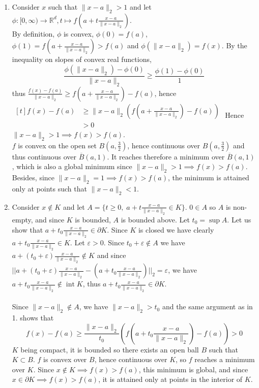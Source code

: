 \documentclass[a4paper,11pt]{article}
\DeclareMathOperator*{\inte}{int}
\begin{document}
\begin{enumerate}
  \item Consider $x$ such that $\|x-a\|_2>1$ and let $\phi:[0,\infty)\to \mathbb R^d, t \mapsto f(a+t\frac{x-a}{\|x-a\|_2})$.\\ By definition, $\phi$ is convex, $\phi(0)=f(a)$, $\phi(1)=f(a+\frac{x-a}{\|x-a\|_2}) > f(a)$ and $\phi(\|x-a\|_2)=f(x)$. By the inequality on slopes of convex real functions, $$\frac{\phi(\|x-a\|_2)-\phi(0)}{\|x-a\|_2} \geq \frac{\phi(1)-\phi(0)}{1}$$ thus $\frac{f(x)-f(a)}{\|x-a\|_2} \geq f(a+\frac{x-a}{\|x-a\|_2}) -f(a)$, hence $\begin{aligned}[t]f(x)-f(a) &\geq \|x-a\|_2 \left(f(a+\frac{x-a}{\|x-a\|_2}) -f(a)\right)\\
  &>0 \end{aligned}$
  Hence $\|x-a\|_2>1 \implies f(x)>f(a)$. \\
  $f$ is convex on the open set $B(a,\frac 32)$, hence continuous over $B(a,\frac 32)$ and thus continuous over $\overline B(a,1)$. It reaches therefore a minimum over $\overline B(a,1)$, which is also a global minimum since $\|x-a\|_2>1 \implies f(x)>f(a)$. Besides, since $\|x-a\|_2=1\implies f(x)>f(a)$, the minimum is attained only at points such that $\|x-a\|_2<1$.

  \item Consider $x\notin K$ and let $A=\{t\geq 0, \; a+t\frac{x-a}{\|x-a\|_2} \in K\}$. $0\in A$ so $A$ is non-empty, and since $K$ is bounded, $A$ is bounded above. Let $t_0=\sup A$. Let us show that $a+t_0\frac{x-a}{\|x-a\|_2}\in \partial K$. Since $K$ is closed we have clearly $a+t_0\frac{x-a}{\|x-a\|_2}\in K$. Let $\varepsilon >0$. Since $t_0+\varepsilon \notin A$ we have $a+(t_0+\varepsilon) \frac{x-a}{\|x-a\|_2} \notin K$ and since $\lvert\lvert a+(t_0+\varepsilon)\frac{x-a}{\|x-a\|_2} - \left(a+t_0\frac{x-a}{\|x-a\|_2} \right)\rvert\rvert_2  = \varepsilon$, we have $a+t_0\frac{x-a}{\|x-a\|_2}\notin \inte K$, thus $a+t_0\frac{x-a}{\|x-a\|_2}\in \partial K$.\\\\
  Since $\|x-a\|_2\notin A$, we have $\|x-a\|_2 > t_0$ and the same argument as in 1. shows that  $$f(x)-f(a) \geq \frac{\|x-a\|_2}{t_0} \left(f(a+t_0\frac{x-a}{\|x-a\|_2}) -f(a)\right)>0$$
  $K$ being compact, it is bounded so there exists an open ball $B$ such that $K\subset B$. $f$ is convex over $B$, hence continuous over $K$, so $f$ reaches a minimum over $K$. Since $x\notin K\implies f(x)>f(a)$, this minimum is global, and since $x\in \partial K\implies f(x)>f(a)$, it is attained only at points in the interior of $K$.

\end{enumerate}
\end{document}
